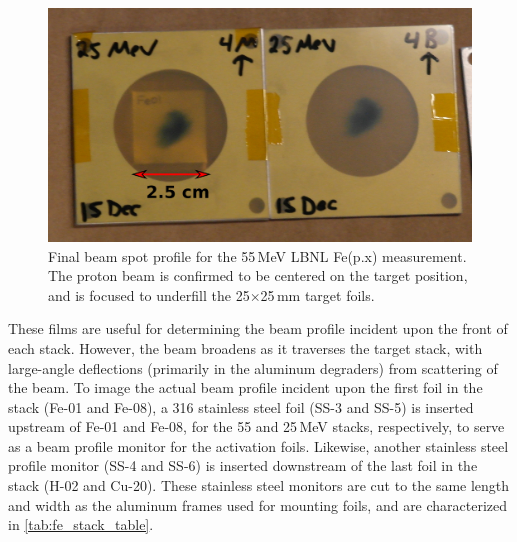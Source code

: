 \begin{figure}
 \centering
 \includegraphics[width=0.75\columnwidth]{./figures/25MeV_optics_films.png}
 \caption{ Final beam spot profile for the 55\,MeV LBNL Fe(p.x) measurement. The  proton beam is confirmed to be centered on the target position, and is focused to underfill the 25$\times$25\,mm target foils.}
 \label{fig:fe55_preexp_beam_spot}
\end{figure}





These films are useful for determining the beam profile incident upon the front of each stack.
However, the beam broadens as it traverses the target stack, with large-angle deflections (primarily in the aluminum degraders) from scattering of the beam.
To image the actual beam profile incident upon the first foil in the stack (Fe-01 and Fe-08), a 316 stainless steel foil (SS-3 and SS-5) is inserted upstream of Fe-01 and Fe-08, for the 55 and 25\,MeV stacks, respectively, to serve as a beam profile monitor for the activation foils.
Likewise, another stainless steel profile monitor (SS-4 and SS-6) is inserted downstream of the last foil in the stack (H-02 and Cu-20).
These stainless steel monitors are cut to the same length and width as the aluminum frames used for mounting foils, and are characterized in \autoref{tab:fe_stack_table}.





